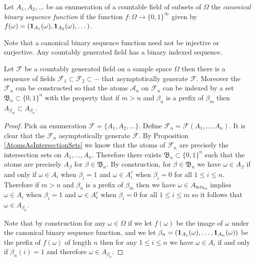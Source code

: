 \begin{defn}Let $A_1, A_2, \dotsc$ be an enumeration of a countable field of subsets of $\Omega$ the \emph{canonical binary sequence function} if the function $f : \Omega \to \lbrace 0,1 \rbrace^\infty$ given by $f(\omega) = (\textbf{1}_{A_1}(\omega), \textbf{1}_{A_2}(\omega), \dotsc)$.
\end{defn}

Note that a canonical binary sequence function need not be injective or surjective. Any countably generated field has a binary indexed sequence.

\begin{prop}Let $\mathcal{F}$ be a countably generated field on a sample space $\Omega$ then there is a sequence of fields $\mathcal{F}_1 \subset \mathcal{F}_2 \subset \dotsb$ that asymptotically generate $\mathcal{F}$.  Moreover the $\mathcal{F}_n$ can be constructed so that the atoms $\mathcal{A}_n$ on $\mathcal{F}_n$ can be indexed by a set $\mathfrak{B}_n \subset \lbrace 0,1 \rbrace^n$ with the property that if $m > n$ and $\beta_n$ is a prefix of $\beta_m$ then $A_{\beta_m} \subset A_{\beta_n}$.  
\end{prop}
\begin{proof}
Pick an enumeration $\mathcal{F} = \lbrace A_1, A_2, \dotsc \rbrace$.  Define $\mathcal{F}_n = \mathcal{F}(A_1, \dotsc, A_n)$.  It is clear that the $\mathcal{F}_n$ asymptotically generate $\mathcal{F}$.  By Proposition \ref{AtomsAsIntersectionSets} we know that the atoms of $\mathcal{F}_n$ are precisely the intersection sets on $A_1, \dotsc, A_n$.  Therefore there exists $\mathfrak{B}_n \subset \lbrace 0,1 \rbrace^n$ such that the atoms are precisely $A_\beta$ for $\beta \in \mathfrak{B}_n$.  By construction, for $\beta \in \mathfrak{B}_n$ we have $\omega \in A_\beta$ if and only if $\omega \in A_i$ when $\beta_i = 1$ and $\omega \in A^c_i$  when $\beta_i = 0$ for all $1 \leq i \leq n$.  Therefore if $m>n$ and  $\beta_n$ is a prefix of $\beta_m$ then we have $\omega \in A_{beta_m}$ implies $\omega \in A_i$ when $\beta_i = 1$ and $\omega \in A^c_i$  when $\beta_i = 0$ for all $1 \leq i \leq m$ so it follows that $\omega \in A_{\beta_n}$.

Note that by construction for any $\omega \in \Omega$ if we let $f(\omega)$ be the image of $\omega$ under the canonical binary sequence function, and we let $\beta_n=(\textbf{1}_{A_1}(\omega), \dotsc, \textbf{1}_{A_n}(\omega))$ be the prefix of $f(\omega)$ of length $n$ then for any $1 \leq i \leq n$ we have $\omega \in A_i$ if and only if $\beta_n(i) = 1$ and therefore $\omega \in A_{\beta_n}$.
\end{proof}

